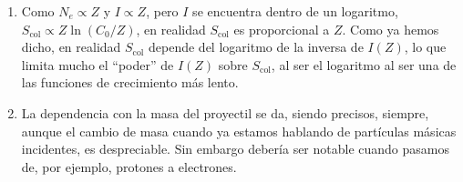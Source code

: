 \begin{enumerate}[label=\alph*)]
    \item Como $N_e \propto Z$ y $I \propto Z$, pero $I$ se encuentra dentro de un logaritmo, $S_{\text{col}} \propto Z \ln (C_0/Z)$, en realidad $S_{\text{col}}$ es proporcional a $Z$. Como ya hemos dicho, en realidad $S_{\text{col}}$ depende del logaritmo de la inversa de $I(Z)$, lo que limita mucho el ``poder'' de $I(Z)$ sobre $S_{\text{col}}$, al ser el logaritmo al ser una de las funciones de crecimiento más lento. 
    \item La dependencia con la masa del proyectil se da, siendo precisos, siempre, aunque el cambio de masa cuando ya estamos hablando de partículas másicas incidentes, es despreciable. Sin embargo debería ser notable cuando pasamos de, por ejemplo, protones a electrones. 
\end{enumerate}


